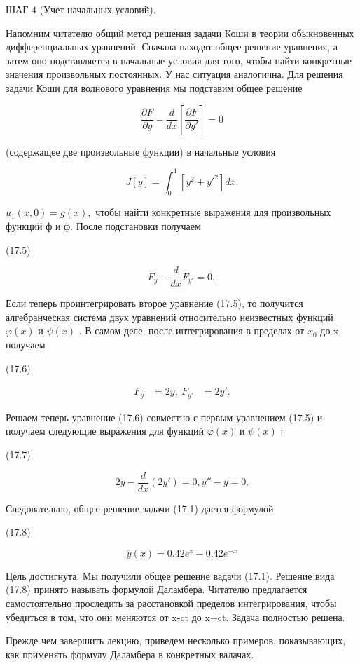 \documentclass[
  ukrainian,
]{article}
\begin{document}
ШАГ 4 (Учет начальных условий).

Напомним читателю общий метод решения задачи Коши в теории обыкновенных
дифференциальных уравнений. Сначала находят общее решение уравнения, а
затем оно подставляется в начальные условия для того, чтобы найти
конкретные значения произвольных постоянных. У нас ситуация аналогична.
Для решения задачи Коши для волнового уравнения мы подставим общее
решение

\[
\frac{\partial F}{\partial y} - \frac{d}{dx} \left[ \frac{\partial F}{\partial y'} \right] = 0
\]

(содержащее две произвольные функции) в начальные условия

\[
J[y] = \int_{0}^{1} [y^{2} + y'^{2}] dx.
\]

\(u_1(x, 0) = g(x),\) чтобы найти конкретные выражения для произвольных
функций ф и ф. После подстановки получаем

(17.5)

\[
F_y - \frac{d}{dx} F_{y'} = 0,
\]

Если теперь проинтегрировать второе уравнение (17.5), то получится
алгебранческая система двух уравнений относительно неизвестных функций
\(\varphi(x)\) и \(\psi(x)\) . В самом деле, после интегрирования в
пределах от \(x_0\) до x получаем

(17.6)

\[
\begin{aligned} F_y &= 2y, \ F_{y'} &= 2y'. \end{aligned}
\]

Решаем теперь уравнение (17.6) совместно с первым уравнением (17.5) и
получаем следующие выражения для функций \(\varphi(x)\) и \(\psi(x)\) :

(17.7)

\[
2y - \frac{d}{dx}(2y') = 0,
y'' - y = 0.
\]

Следовательно, общее решение задачи (17.1) дается формулой

(17.8)

\[
\overline{y}(x) = 0.42e^x - 0.42e^{-x}
\]

Цель достигнута. Мы получили общее решение вадачи (17.1). Решение вида
(17.8) принято называть формулой Даламбера. Читателю предлагается
самостоятельно проследить за расстановкой пределов интегрирования, чтобы
убедиться в том, что они меняются от x-ct до x+ct. Задача полностью
решена.

Прежде чем завершить лекцию, приведем несколько примеров, показывающих,
как применять формулу Даламбера в конкретных валачах.
\end{document}

